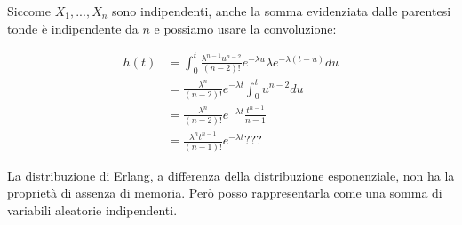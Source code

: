 \documentclass[a4paper,12pt]{book}
\begin{document}
Siccome $ X_1, ..., X_n $ sono indipendenti, anche la somma evidenziata dalle parentesi tonde è indipendente da $ n $ e possiamo usare la convoluzione:

\begin{align*}
	h(t) & = \int_{0}^{t}\frac{\lambda^{n-1} u^{n-2}}{(n-2)!} e^{-\lambda u} \lambda e^{-\lambda(t-u)} du \\
	& = \frac{\lambda^n}{(n-2)!}e^{-\lambda t} \int_{0}^{t} u^{n-2} du \\
	& = \frac{\lambda^n}{(n-2)!} e^{-\lambda t} \frac{t^{n-1}}{n-1} \\
	& = \frac{\lambda^n t^{n-1}}{(n-1)!} e^{-\lambda t} ??? %
\end{align*}

La distribuzione di Erlang, a differenza della distribuzione esponenziale, non ha la proprietà di assenza di memoria. Però posso rappresentarla come una somma di variabili aleatorie indipendenti. 



\backmatter
\end{document}
